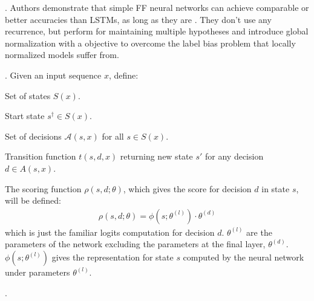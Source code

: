 \documentclass[11pt]{article}
\begin{document}
\p {}. Authors demonstrate that simple FF neural networks can achieve comparable or better accuracies than LSTMs, as long as they are . They don't use any recurrence, but perform  for maintaining multiple hypotheses and introduce global normalization with a  objective to overcome the label bias problem that locally normalized models suffer from. 

\myspace 
\p {}. Given an input sequence $x$, define:
\begin{compactitem}
	\item Set of states $S(x)$.
	\item Start state $s^{\dagger} \in S(x)$.
	\item Set of decisions $\mathcal{A}(s, x)$ for all $s \in S(x)$. 
	\item Transition function $t(s, d, x)$ returning new state $s'$ for any decision $d \in A(s, x)$.  
\end{compactitem}
The scoring function $\rho(s, d; \theta)$, which gives the score for decision $d$ in state $s$, will be defined:
\begin{align}
\rho(s, d; \theta) = \phi(s; \theta^{(l)}) \cdot \theta^{(d)}
\end{align}
which is just the familiar logits computation for decision $d$. $\theta^{(l)}$ are the parameters of the network excluding the parameters at the final layer, $\theta^{(d)}$. $\phi(s; \theta^{(l)})$ gives the representation for state $s$ computed by the neural network under parameters $\theta^{(l)}$.

\myspace
\p {}. 
\end{document}
